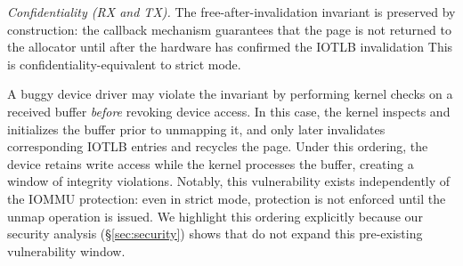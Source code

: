 \emph{Confidentiality (RX and TX).}
The free-after-invalidation invariant is preserved by construction: the callback mechanism guarantees that the page is not returned to the allocator until after the hardware has confirmed the IOTLB invalidation
This is confidentiality-equivalent to strict mode.
\fi




A buggy device driver may violate the invariant by performing kernel checks 
    on a received buffer \emph{before} revoking device access. 
In this case, the kernel inspects and initializes the buffer prior to unmapping it, 
    and only later invalidates corresponding IOTLB entries and recycles the page.
Under this ordering, the device retains write access while the kernel processes the buffer, 
    creating a window of integrity violations. 
Notably, this vulnerability exists independently of the IOMMU protection: 
    even in strict mode, protection is not enforced until the unmap operation is issued. 
We highlight this ordering explicitly because our security analysis (\S\ref{sec:security}) 
    shows that \brand{} do not expand this pre-existing vulnerability window.
\fi 